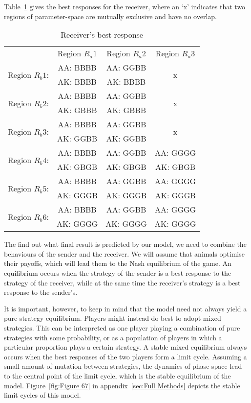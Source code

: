 \documentclass[a4paper,12pt]{article}
\numberwithin{equation}{section}
\renewcommand*{\arraystretch}{1.4}
\begin{document}
\vspace{2mm}

Table~\ref{tab:CueGamewithObservableAmplification/BestResponseR} gives the best responses for the receiver, where an `x' indicates that two regions of parameter-space are mutually exclusive and have no overlap.

\begin{table}[h]
\renewcommand*{\arraystretch}{1.35}
\begin{center}
\begin{tabular}{lccc}
 & Region $R_{a}1$ & Region $R_{a}2$ & Region $R_{a}3$\\
\multirow{2}{*}{Region $R_{b}1$:} & AA: BBBB & AA: GGBB & \multirow{2}{*}{x}\\
& AK: BBBB & AK: BBBB &\\
\multirow{2}{*}{Region $R_{b}2$:} & AA: BBBB & AA: GGBB & \multirow{2}{*}{x}\\
& AK: GBBB & AK: GBBB &\\
\multirow{2}{*}{Region $R_{b}3$:} & AA: BBBB & AA: GGBB & \multirow{2}{*}{x}\\
& AK: GGBB & AK: GGBB &\\
\multirow{2}{*}{Region $R_{b}4$:} & AA: BBBB & AA: GGBB & AA: GGGG\\
& AK: GBGB & AK: GBGB & AK: GBGB\\
\multirow{2}{*}{Region $R_{b}5$:} & AA: BBBB & AA: GGBB & AA: GGGG\\
& AK: GGGB & AK: GGGB & AK: GGGB\\
\multirow{2}{*}{Region $R_{b}6$:} & AA: BBBB & AA: GGBB & AA: GGGG\\
& AK: GGGG & AK: GGGG & AK: GGGG
\end{tabular}
\end{center}
\caption{Receiver's best response}
\label{tab:CueGamewithObservableAmplification/BestResponseR}
\end{table}

The find out what final result is predicted by our model, we need to combine the behaviours of the sender and the receiver. We will assume that animals optimise their payoffs, which will lead them to the Nash equilibrium of the game. An equilibrium occurs when the strategy of the sender is a best response to the strategy of the receiver, while at the same time the receiver's strategy is a best response to the sender's.

It is important, however, to keep in mind that the model need not always yield a pure-strategy equilibrium. Players might instead do best to adopt mixed strategies. This can be interpreted as one player playing a combination of pure strategies with some probability, or as a population of players in which a particular proportion plays a certain strategy. A stable mixed equilibrium always occurs when the best responses of the two players form a limit cycle. Assuming a small amount of mutation between strategies, the dynamics of phase-space lead to the central point of the limit cycle, which is the stable equilibrium of the model. Figure~\ref{fig:Figure 67} in appendix~\ref{sec:Full Methods} depicts the stable limit cycles of this model.
\end{document}
